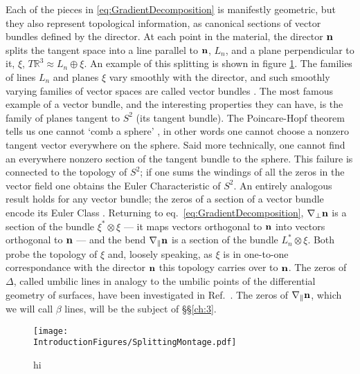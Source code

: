 Each of the pieces in \ref{eq:GradientDecomposition} is manifestly geometric, but they also represent topological information, as canonical sections of vector bundles defined by the director. At each point in the material, the director $\bf n$ splits the tangent space into a line parallel to $\bf n$, $L_n$, and a plane perpendicular to it, $\xi$, $T \mathbb{R}^3 \approx L_n \oplus \xi$. An example of this splitting is shown in figure \ref{fig:SplittingMontage}. The families of lines $L_n$ and planes $\xi$ vary smoothly with the director, and such smoothly varying families of vector spaces are called vector bundles \citep{TuBook,MilnorStasheffBook}. The most famous example of a vector bundle, and the interesting properties they can have, is the family of planes tangent to $S^2$ (its tangent bundle). The Poincare-Hopf theorem tells us one cannot `comb a sphere' \citep{Milnor1997}, in other words one cannot choose a nonzero tangent vector everywhere on the sphere. Said more technically, one cannot find an everywhere nonzero section of the tangent bundle to the sphere. This failure is connected to the topology of $S^2$; if one sums the windings of all the zeros in the vector field one obtains the Euler Characteristic of $S^2$. An entirely analogous result holds for any vector bundle; the zeros of a section of a vector bundle encode its Euler Class \citep{BottTuBook, MilnorStasheffBook}. Returning to eq.~\ref{eq:GradientDecomposition}, $\nabla_\perp \bf n$ is a section of the bundle $\xi^* \otimes \xi$ --- it maps vectors orthogonal to $\bf n$ into vectors orthogonal to $\bf n$ --- and the bend $\nabla_\parallel \bf n$ is a section of the bundle $L_n^* \otimes \xi$. Both probe the topology of $\xi$ and, loosely speaking, as $\xi$ is in one-to-one correspondance with the director $\bf n$ this topology carries over to $\bf n$. The zeros of $\Delta$, called umbilic lines in analogy to the umbilic points of the differential geometry of surfaces, have been investigated in Ref.~\citep{Machon2016b}. The zeros of $\nabla_{\parallel} \bf n$, which we will call $\beta$ lines, will be the subject of \S\S\ref{ch:3}.
\begin{figure}[htbp]
\centering
\texttt{[image: \\IntroductionFigures/SplittingMontage.pdf]}
\caption{hi }
\label{fig:SplittingMontage}
\end{figure}


